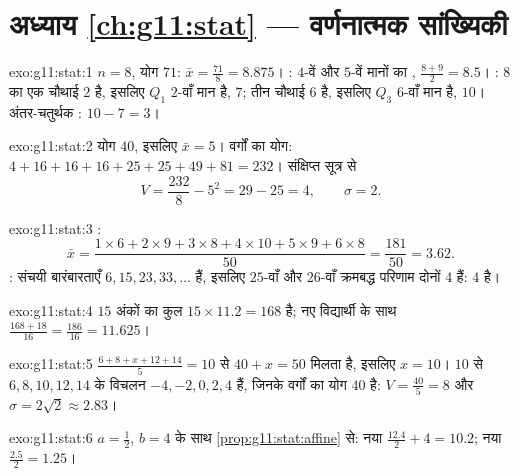 \section*{अध्याय \ref{ch:g11:stat} --- वर्णनात्मक सांख्यिकी}

\begin{solution}{exo:g11:stat:1}
$n = 8$, योग $71$:  $\bar x = \frac{71}{8} = 8.875$। : $4$-वें और $5$-वें मानों का ,
$\frac{8 + 9}{2} = 8.5$। : $8$ का एक चौथाई $2$ है, इसलिए $Q_1$ $2$-वाँ मान है, $7$; तीन
चौथाई $6$ है, इसलिए $Q_3$ $6$-वाँ मान है, $10$। अंतर-चतुर्थक : $10 - 7 = 3$।
\end{solution}

\begin{solution}{exo:g11:stat:2}
योग $40$, इसलिए $\bar x = 5$। वर्गों का योग: $4 + 16 + 16 + 16 + 25 + 25 + 49 + 81 = 232$। संक्षिप्त सूत्र से
\[
V = \frac{232}{8} - 5^2 = 29 - 25 = 4,
\qquad
\sigma = 2 .
\]
\end{solution}

\begin{solution}{exo:g11:stat:3}
:
\[
\bar x = \frac{1 \times 6 + 2 \times 9 + 3 \times 8 + 4 \times 10
+ 5 \times 9 + 6 \times 8}{50}
= \frac{181}{50} = 3.62 .
\]
: संचयी बारंबारताएँ $6, 15, 23, 33, \dots$ हैं, इसलिए $25$-वाँ और $26$-वाँ क्रमबद्ध
परिणाम दोनों $4$ हैं:  $4$ है।
\end{solution}

\begin{solution}{exo:g11:stat:4}
$15$ अंकों का कुल $15 \times 11.2 = 168$ है; नए विद्यार्थी के साथ $\frac{168 + 18}{16} = \frac{186}{16} = 11.625$।
\end{solution}

\begin{solution}{exo:g11:stat:5}
$\frac{6 + 8 + x + 12 + 14}{5} = 10$ से $40 + x = 50$ मिलता है, इसलिए $x = 10$।  $10$ से $6, 8, 10, 12, 14$ के विचलन $-4, -2, 0, 2, 4$ हैं,
जिनके वर्गों का योग $40$ है: $V = \frac{40}{5} = 8$ और $\sigma = 2\sqrt2 \approx 2.83$।
\end{solution}

\begin{solution}{exo:g11:stat:6}
$a = \frac12$, $b = 4$ के साथ \cref{prop:g11:stat:affine} से: नया  $\frac{12.4}{2} + 4 = 10.2$; नया  $\frac{2.5}{2} = 1.25$।
\end{solution}

